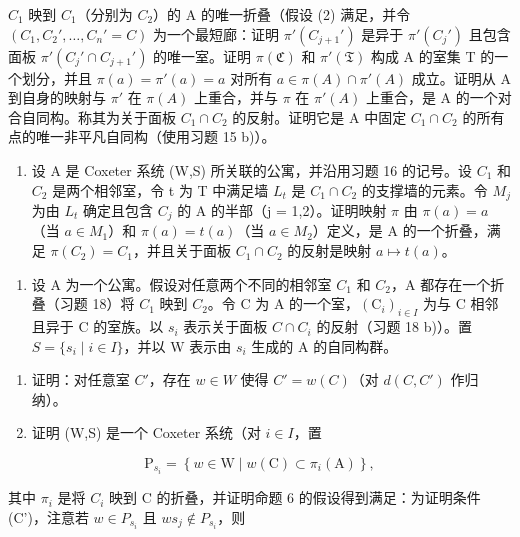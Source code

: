 \(C_{1}\) 映到 \(C_{1}\)（分别为 \(C_{2}\)）的 A 的唯一折叠（假设 (2) 满足，并令 \((C_{1}, C_{2}', \ldots, C_{n}' = C)\) 为一个最短廊：证明 \(\pi'(C_{j+1}')\) 是异于 \(\pi'(C_{j}')\) 且包含面板 \(\pi'(C_{j}' \cap C_{j+1}')\) 的唯一室。证明 \(\pi(\mathfrak{C})\) 和 \(\pi'(\mathfrak{T})\) 构成 A 的室集 T 的一个划分，并且 \(\pi(a) = \pi'(a) = a\) 对所有 \(a \in \pi(A) \cap \pi'(A)\) 成立。证明从 A 到自身的映射与 \(\pi'\) 在 \(\pi(A)\) 上重合，并与 \(\pi\) 在 \(\pi'(A)\) 上重合，是 A 的一个对合自同构。称其为关于面板 \(C_{1} \cap C_{2}\) 的反射。证明它是 A 中固定 \(C_{1} \cap C_{2}\) 的所有点的唯一非平凡自同构（使用习题 15 b)）。

\begin{enumerate}
\def\labelenumi{\alph{enumi})}
\setcounter{enumi}{2}
\tightlist
\item
  设 A 是 Coxeter 系统 (W,S) 所关联的公寓，并沿用习题 16 的记号。设 \(C_{1}\) 和 \(C_{2}\) 是两个相邻室，令 t 为 T 中满足墙 \(L_{t}\) 是 \(C_{1} \cap C_{2}\) 的支撑墙的元素。令 \(M_{j}\) 为由 \(L_{t}\) 确定且包含 \(C_{j}\) 的 A 的半部（j = 1,2）。证明映射 \(\pi\) 由 \(\pi(a) = a\)（当 \(a \in M_{1}\)）和 \(\pi(a) = t(a)\)（当 \(a \in M_{2}\)）定义，是 A 的一个折叠，满足 \(\pi(C_{2}) = C_{1}\)，并且关于面板 \(C_{1} \cap C_{2}\) 的反射是映射 \(a \mapsto t(a)\)。
\end{enumerate}

\begin{enumerate}
\def\labelenumi{\arabic{enumi})}
\setcounter{enumi}{18}
\tightlist
\item
  设 A 为一个公寓。假设对任意两个不同的相邻室 \(C_{1}\) 和 \(C_{2}\)，A 都存在一个折叠（习题 18）将 \(C_{1}\) 映到 \(C_{2}\)。令 C 为 A 的一个室，\((\mathrm{C}_{i})_{i\in I}\) 为与 C 相邻且异于 C 的室族。以 \(s_{i}\) 表示关于面板 \(C\cap C_{i}\) 的反射（习题 18 b)）。置 \(S=\{s_{i}\mid i\in I\}\)，并以 W 表示由 \(s_{i}\) 生成的 A 的自同构群。
\end{enumerate}

\begin{enumerate}
\def\labelenumi{\alph{enumi})}
\item
  证明：对任意室 \(C'\)，存在 \(w \in W\) 使得 \(C' = w(C)\)（对 \(d(C, C')\) 作归纳）。
\item
  证明 (W,S) 是一个 Coxeter 系统（对 \(i\in I\)，置
\end{enumerate}

\[
\mathrm{P} _ {s _ {i}} = \left\{w \in \mathrm{W} \mid w (\mathrm{C}) \subset \pi_ {i} (\mathrm{A}) \right\},
\]

其中 \(\pi_{i}\) 是将 \(C_{i}\) 映到 C 的折叠，并证明命题 6 的假设得到满足：为证明条件 (C')，注意若 \(w \in P_{s_{i}}\) 且 \(ws_{j} \notin P_{s_{i}}\)，则

